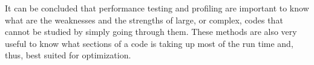 \documentclass[12pt,a4paper]{article}
\begin{document}
It can be concluded that performance testing and profiling are important to 
know what are the weaknesses and the strengths of large, or complex, codes that 
cannot be studied by simply going through them. These methods are also very 
useful to know what sections of a code is taking up most of the run time and, 
thus, best suited for optimization.









\end{document}
